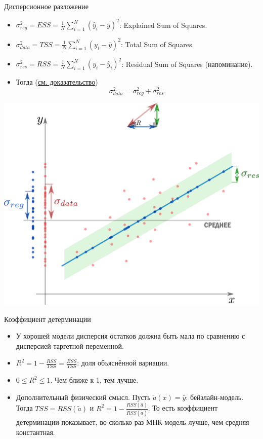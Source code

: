 \documentclass[9pt]{beamer}
\begin{document}
\begin{frame}{Дисперсионное разложение}
\begin{itemize}
    \item $\sigma^2_{reg} = ESS = \frac{1}{N}\sum_{i=1}^N (\hat y_i - \bar y)^2$: Explained Sum of Squares.
    \item $\sigma^2_{data} = TSS = \frac{1}{N}\sum_{i=1}^N (y_i - \bar y)^2$: Total Sum of Squares.
    \item $\sigma^2_{res} = RSS = \frac{1}{N}\sum_{i=1}^N (y_i - \hat y_i)^2$: Residual Sum of Squares (напоминание).
    \item Тогда (\href{https://en.wikipedia.org/wiki/Explained_sum_of_squares\#Simple_derivation}{см. доказательство})
    \begin{equation}\label{linreg_variance_decomposition}
        \sigma^2_{data} = \sigma^2_{reg} + \sigma^2_{res}.
    \end{equation}
\end{itemize}
\begin{center}
    \includegraphics[height=0.55\textheight]{img/linear_regression_tss_ess_rss.png}
\end{center}
\end{frame}

\begin{frame}{Коэффициент детерминации}
    \begin{itemize}
        \item У хорошей модели дисперсия остатков должна быть мала по сравнению с дисперсией таргетной переменной.
        \item $R^2 = 1 - \frac{RSS}{TSS} = \frac{ESS}{TSS}$: доля объяснённой вариации. 
        \item $0 \leq R^2 \leq 1$. Чем ближе к 1, тем лучше.
        \item Дополнительный физический смысл. Пусть $\tilde a(x) = \bar y$: бейзлайн-модель. Тогда $TSS = RSS(\tilde a)$ и $R^2 = 1 - \frac{RSS(\hat a)}{RSS(\tilde a)}$. То есть коэффициент детерминации показывает, во сколько раз МНК-модель лучше, чем средняя константная.
    \end{itemize}
\end{frame}
\end{document}
